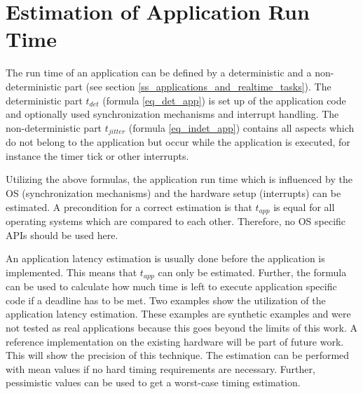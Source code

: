 \section{Estimation of Application Run Time}
The run time of an application can be defined by a deterministic and a non-deterministic part (see section \ref{ss_applications_and_realtime_tasks}). 
The deterministic part $t_{det}$ (formula \ref{eq_det_app}) is set up of the application code and optionally used synchronization mechanisms and interrupt handling.
The non-deterministic part $t_{jitter}$ (formula \ref{eq_indet_app}) contains all aspects which do not belong to the application but occur while the application is executed, for instance the timer tick or other interrupts.  
\par
Utilizing the above formulas, the application run time which is influenced by the \ac{OS} (synchronization mechanisms) and the hardware setup (interrupts) can be estimated. 
A precondition for a correct estimation is that $t_{app}$ is equal for all operating systems which are compared to each other. 
Therefore, no \ac{OS} specific \acp{API} should be used here.
\par
An application latency estimation is usually done before the application is implemented. 
This means that $t_{app}$ can only be estimated. 
Further, the formula can be used to calculate how much time is left to execute application specific code if a deadline has to be met. 
Two examples show the utilization of the application latency estimation.
These examples are synthetic examples and were not tested as real applications because this goes beyond the limits of this work.
A reference implementation on the existing hardware will be part of future work.
This will show the precision of this technique.
The estimation can be performed with mean values if no hard timing requirements are necessary. 
Further, pessimistic values can be used to get a worst-case timing estimation.

